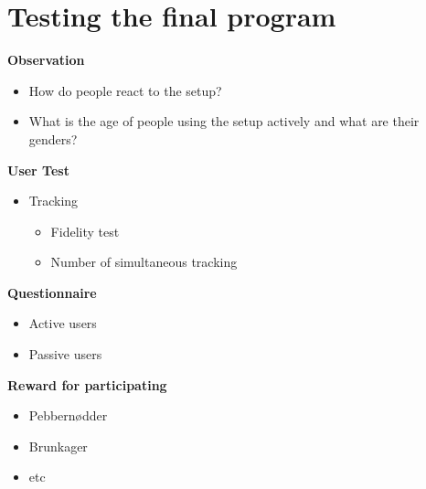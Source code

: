 \chapter{Testing the final program}
\textbf{Observation}
\begin{itemize}
\item How do people react to the setup?
\item What is the age of people using the setup actively and what are their genders?
\end{itemize}

\textbf{User Test}
\begin{itemize}
\item Tracking
\begin{itemize}
\item Fidelity test
\item Number of simultaneous tracking
\end{itemize}
\end{itemize}

\textbf{Questionnaire}
\begin{itemize}
\item Active users
\item Passive users
\end{itemize}
\textbf{Reward for participating}
\begin{itemize}
\item Pebbernødder
\item Brunkager
\item etc
\end{itemize}
